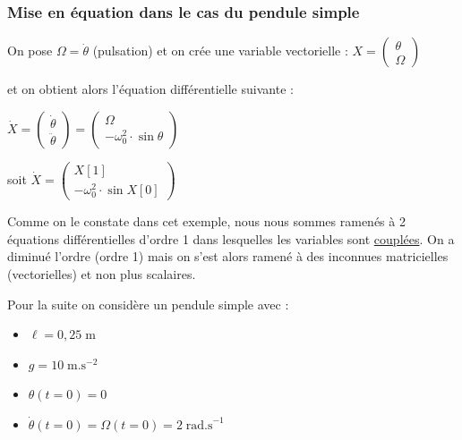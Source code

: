 \documentclass[11pt]{article}
\begin{document}
 
 \subsubsection{Mise en équation dans le cas du pendule simple}
 

On pose $\Omega = \dot{\theta}$ (pulsation) et on  crée une variable vectorielle : $X = \left(\begin{array}{l}
                                                     \theta\\
                                                     \Omega
                                                    \end{array}\right)$

et on obtient alors l'équation différentielle suivante : 

$\dot{X} = \left(\begin{array}{l}
                                                     \dot{\theta}\\
                                                     \ddot{\theta}
                                                    \end{array}\right) = \left(\begin{array}{c}
                                                     \Omega\\
                                                     -\omega_0^2\cdot \sin \theta
                                                    \end{array}\right)$

                                                    soit $\dot{X} = \left(\begin{array}{c}
                                                     X[1]\\
                                                     -\omega_0^2\cdot \sin X[0]
                                                    \end{array}\right)$


Comme on le constate dans cet exemple, nous nous sommes ramenés à 2 équations différentielles d'ordre 1 dans lesquelles les variables sont \underline{couplées}. On a diminué l'ordre (ordre 1) mais on s'est alors ramené à des inconnues matricielles (vectorielles) et non plus scalaires.

  
  \medskip

  Pour la suite on considère un pendule simple avec : 
  \begin{itemize}
   \item $\ell = 0,25\;\text{m}$
   \item $g = 10\;\text{m.s}^{-2}$
   \item $\theta(t=0) = 0$
   \item $\dot{\theta}(t=0) = \Omega(t=0) = 2\;\text{rad.s}^{-1}$
  \end{itemize}
\end{document}
